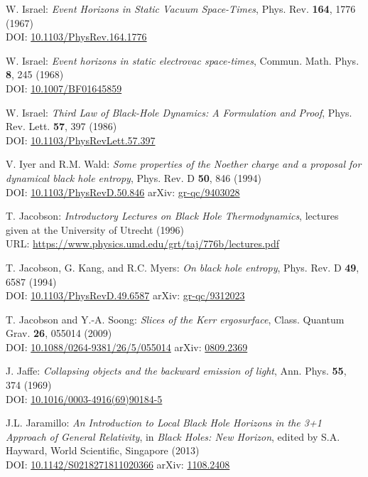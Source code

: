 \begin{thebibliography}{123}
W. Israel: {\em Event Horizons in Static Vacuum Space-Times},
Phys. Rev. {\bf 164}, 1776 (1967)\\
DOI: \href{https://doi.org/10.1103/PhysRev.164.1776}{10.1103/PhysRev.164.1776}

W. Israel: {\em Event horizons in static electrovac space-times},
Commun. Math. Phys. {\bf 8}, 245 (1968)\\
DOI: \href{https://doi.org/10.1007/BF01645859}{10.1007/BF01645859}

W. Israel:
{\em Third Law of Black-Hole Dynamics: A Formulation and Proof},
Phys. Rev. Lett. {\bf 57}, 397 (1986)\\
DOI: \href{https://doi.org/10.1103/PhysRevLett.57.397}{10.1103/PhysRevLett.57.397}

V. Iyer and R.M. Wald:
{\em Some properties of the Noether charge and a proposal for dynamical black hole entropy},
Phys. Rev. D {\bf 50}, 846 (1994)\\
DOI: \href{https://doi.org/10.1103/PhysRevD.50.846}{10.1103/PhysRevD.50.846}\hfill
arXiv: \href{https://arxiv.org/abs/gr-qc/9403028}{gr-qc/9403028}

T. Jacobson:
{\em Introductory Lectures on Black Hole Thermodynamics},
lectures given at the University of Utrecht (1996)\\
URL: \url{https://www.physics.umd.edu/grt/taj/776b/lectures.pdf}

T. Jacobson, G. Kang, and R.C. Myers:
{\em On black hole entropy},
Phys. Rev. D {\bf 49}, 6587 (1994)\\
DOI: \href{https://doi.org/10.1103/PhysRevD.49.6587}{10.1103/PhysRevD.49.6587}\hfill
arXiv: \href{https://arxiv.org/abs/gr-qc/9312023}{gr-qc/9312023}

T. Jacobson and Y.-A. Soong:
{\em Slices of the Kerr ergosurface},
Class. Quantum Grav. {\bf 26}, 055014 (2009)\\
DOI: \href{https://doi.org/10.1088/0264-9381/26/5/055014}{10.1088/0264-9381/26/5/055014}\hfill
arXiv: \href{https://arxiv.org/abs/0809.2369}{0809.2369}

J. Jaffe:
{\em Collapsing objects and the backward emission of light},
Ann. Phys. {\bf 55}, 374 (1969)\\
DOI: \href{https://doi.org/10.1016/0003-4916(69)90184-5}{10.1016/0003-4916(69)90184-5}

J.L. Jaramillo: {\em An Introduction to Local Black Hole Horizons in the 3+1
Approach of General Relativity}, in {\em Black Holes: New Horizon}, edited
by S.A. Hayward, World Scientific, Singapore (2013)\\
DOI: \href{https://doi.org/10.1142/S0218271811020366}{10.1142/S0218271811020366}\hfill
arXiv: \href{https://arxiv.org/abs/1108.2408}{1108.2408}


\end{thebibliography}
